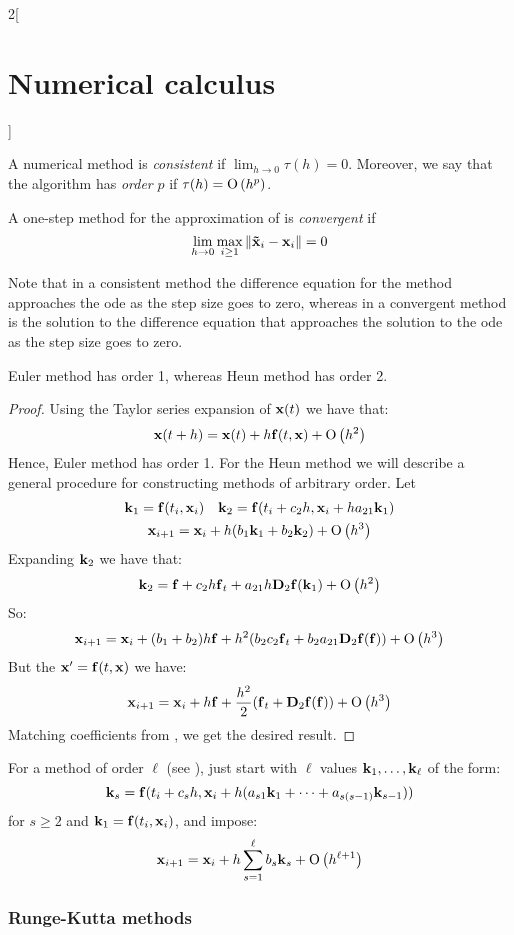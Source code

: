 \documentclass[../../../main_math.tex]{subfiles}
\begin{document}
\begin{multicols}{2}[\section{Numerical calculus}]
\begin{definition}
    A numerical method is \emph{consistent} if $\displaystyle\lim_{h\to 0}\tau(h)=0$. Moreover, we say that the algorithm has \emph{order} $p$ if $\tau(h)=\mathrm{O}\left(h^p\right)$.
  \end{definition}
  \begin{definition}
    A one-step method for the approximation of  is \emph{convergent} if $$\lim_{h\to 0}\max_{i\geq 1}\left\|\boldsymbol{\mathrm{\tilde{x}}}_i-\boldsymbol{\mathrm{x}}_i\right\|=0$$
  \end{definition}
  \begin{remark}
    Note that in a consistent method the difference equation for the
    method approaches the ode as the step size goes to zero, whereas in a convergent method is the solution to the difference equation that approaches the solution to the ode as the step size goes to zero.
  \end{remark}
  \begin{lemma}
    Euler method has order 1, whereas Heun method has order 2.
  \end{lemma}
  \begin{proof}
    Using the Taylor series expansion of $\boldsymbol{\mathrm{x}}(t)$ we have that:
    $$\boldsymbol{\mathrm{x}}(t+h) = \boldsymbol{\mathrm{x}}(t)+h\boldsymbol{\mathrm{f}}(t,\boldsymbol{\mathrm{x}}) + \mathrm{O}\left(h^2\right)$$
    Hence, Euler method has order 1. For the Heun method we will describe a general procedure for constructing methods of arbitrary order. Let
    \begin{gather*}
      \boldsymbol{\mathrm{k}}_1=\boldsymbol{\mathrm{f}}(t_i,\boldsymbol{\mathrm{x}}_i)\quad \boldsymbol{\mathrm{k}}_2=\boldsymbol{\mathrm{f}}(t_i+c_2h,\boldsymbol{\mathrm{x}}_i+ha_{21}\boldsymbol{\mathrm{k}}_1)\\
      \boldsymbol{\mathrm{x}}_{i+1}=\boldsymbol{\mathrm{x}}_i+h(b_1\boldsymbol{\mathrm{k}}_1+b_2\boldsymbol{\mathrm{k}}_2)+\mathrm{O}\left(h^3\right)
    \end{gather*}
    Expanding $\boldsymbol{\mathrm{k}}_2$ we have that:
    $$\boldsymbol{\mathrm{k}}_2=\boldsymbol{\mathrm{f}}+c_2h\boldsymbol{\mathrm{f}}_t+a_{21}h\boldsymbol{\mathrm{D}}_2\boldsymbol{\mathrm{f}}(\boldsymbol{\mathrm{k}}_1)+\mathrm{O}\left(h^2\right)$$
    So:
    \begin{equation}\label{NC:heun1}
      \boldsymbol{\mathrm{x}}_{i+1}=\boldsymbol{\mathrm{x}}_i+(b_1+b_2)h\boldsymbol{\mathrm{f}}+h^2(b_2c_2\boldsymbol{\mathrm{f}}_t+b_2a_{21}\boldsymbol{\mathrm{D}}_2\boldsymbol{\mathrm{f}}(\boldsymbol{\mathrm{f}}))+\mathrm{O}\left(h^3\right)
    \end{equation}
    But the $\boldsymbol{\mathrm{x}}'=\boldsymbol{\mathrm{f}}(t,\boldsymbol{\mathrm{x}})$ we have:
    \begin{equation}\label{NC:heun2}
      \boldsymbol{\mathrm{x}}_{i+1}=\boldsymbol{\mathrm{x}}_i+h\boldsymbol{\mathrm{f}}+\frac{h^2}{2}(\boldsymbol{\mathrm{f}}_t+\boldsymbol{\mathrm{D}}_2\boldsymbol{\mathrm{f}}(\boldsymbol{\mathrm{f}}))+\mathrm{O}\left(h^3\right)
    \end{equation}
    Matching coefficients from , we get the desired result.
  \end{proof}
  \begin{remark}
    For a method of order $\ell$ (see ), just start with $\ell$ values $\boldsymbol{\mathrm{k}}_1,\ldots,\boldsymbol{\mathrm{k}}_\ell$ of the form: $$\boldsymbol{\mathrm{k}}_s=\boldsymbol{\mathrm{f}}(t_i+c_sh,\boldsymbol{\mathrm{x}}_i+h(a_{s1}\boldsymbol{\mathrm{k}}_1+\cdots+a_{s(s-1)}\boldsymbol{\mathrm{k}}_{s-1}))$$
    for $s\geq 2$ and $\boldsymbol{\mathrm{k}}_1=\boldsymbol{\mathrm{f}}(t_i,\boldsymbol{\mathrm{x}}_i)$, and impose:
    $$\boldsymbol{\mathrm{x}}_{i+1}=\boldsymbol{\mathrm{x}}_i+h\sum_{s=1}^\ell b_s\boldsymbol{\mathrm{k}}_s+\mathrm{O}\left(h^{\ell+1}\right)$$
  \end{remark}
  \subsubsection{Runge-Kutta methods}\label{NC:rungekutta}
\end{multicols}
\end{document}
